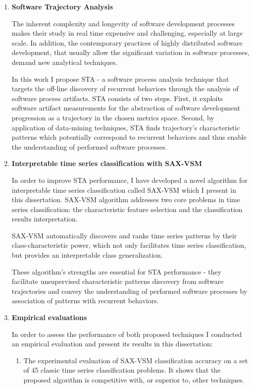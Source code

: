 \begin{enumerate}

\item \textbf{Software Trajectory Analysis}

The inherent complexity and longevity of software development processes makes their study in real time
expensive and challenging, especially at large scale. 
In addition, the contemporary practices of highly distributed software development, that usually allow 
the significant variation in software processes, demand new analytical techniques.

In this work I propose STA - a software process analysis technique that targets the off-line discovery 
of recurrent behaviors through the analysis of software process artifacts. 
STA consists of two steps. 
First, it exploits software artifact measurements for the abstraction of software development 
progression as a trajectory in the chosen metrics space. 
Second, by application of data-mining techniques, STA finds trajectory's characteristic 
patterns which potentially correspond to recurrent behaviors and thus enable the understanding of performed software processes.

\item \textbf{Interpretable time series classification with SAX-VSM}

In order to improve STA performance, I have developed a novel algorithm for interpretable time 
series classification called SAX-VSM which I present in this dissertation. 
SAX-VSM algorithm addresses two core problems in time series classification: 
the characteristic feature selection and the classification results interpretation. 

SAX-VSM  automatically discovers and ranks time series patterns by their
class-characteristic power, which not only facilitates time series classification, but provides an 
interpretable class generalization.

These algorithm's strengths are essential for STA performance - they facilitate unsupervised characteristic 
patterns discovery from software trajectories and convey the understanding of performed software processes 
by association of patterns with recurrent behaviors.

\item \textbf{Empirical evaluations}

In order to assess the performance of both proposed techniques I conducted an empirical evaluation and 
present its results in this dissertation:
\begin{enumerate}
 \item The experimental evaluation of SAX-VSM classification accuracy on a set of 45 classic time series classification problems. It shows that the proposed algorithm is competitive with, or superior to, other techniques.


\end{enumerate}
\end{enumerate}
